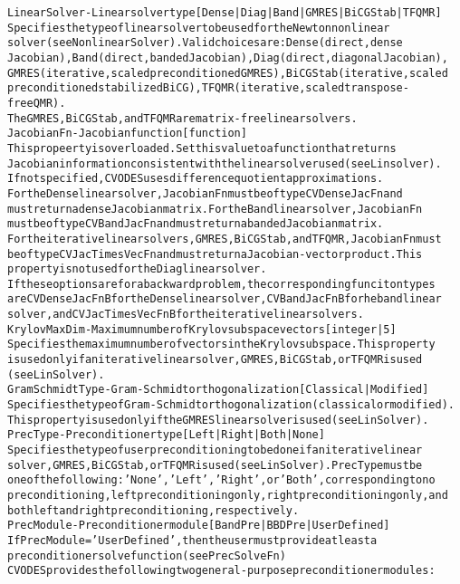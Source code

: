 \begin{alltt}
LinearSolver - Linear solver type [{Dense}|Diag|Band|GMRES|BiCGStab|TFQMR]
   Specifies the type of linear solver to be used for the Newton nonlinear
   solver (see NonlinearSolver). Valid choices are: Dense (direct, dense
   Jacobian), Band (direct, banded Jacobian), Diag (direct, diagonal Jacobian),
   GMRES (iterative, scaled preconditioned GMRES), BiCGStab (iterative, scaled
   preconditioned stabilized BiCG), TFQMR (iterative, scaled transpose-free QMR).
   The GMRES, BiCGStab, and TFQMR are matrix-free linear solvers.
JacobianFn - Jacobian function [ function ]
   This propeerty is overloaded. Set this value to a function that returns
   Jacobian information consistent with the linear solver used (see Linsolver).
   If not specified, CVODES uses difference quotient approximations.
   For the Dense linear solver, JacobianFn must be of type CVDenseJacFn and
   must return a dense Jacobian matrix. For the Band linear solver, JacobianFn
   must be of type CVBandJacFn and must return a banded Jacobian matrix.
   For the iterative linear solvers, GMRES, BiCGStab, and TFQMR, JacobianFn must
   be of type CVJacTimesVecFn and must return a Jacobian-vector product. This
   property is not used for the Diag linear solver.
   If these options are for a backward problem, the corresponding funciton types
   are CVDenseJacFnB for the Dense linear solver, CVBandJacFnB for he band linear
   solver, and CVJacTimesVecFnB for the iterative linear solvers.
KrylovMaxDim - Maximum number of Krylov subspace vectors [ integer | {5} ]
   Specifies the maximum number of vectors in the Krylov subspace. This property
   is used only if an iterative linear solver, GMRES, BiCGStab, or TFQMR is used
   (see LinSolver).
GramSchmidtType - Gram-Schmidt orthogonalization [ Classical | {Modified} ]
   Specifies the type of Gram-Schmidt orthogonalization (classical or modified).
   This property is used only if the GMRES linear solver is used (see LinSolver).
PrecType - Preconditioner type [ Left | Right | Both | {None} ]
   Specifies the type of user preconditioning to be done if an iterative linear
   solver, GMRES, BiCGStab, or TFQMR is used (see LinSolver). PrecType must be
   one of the following: 'None', 'Left', 'Right', or 'Both', corresponding to no
   preconditioning, left preconditioning only, right preconditioning only, and
   both left and right preconditioning, respectively.
PrecModule - Preconditioner module [ BandPre | BBDPre | {UserDefined} ]
   If PrecModule = 'UserDefined', then the user must provide at least a
   preconditioner solve function (see PrecSolveFn)
   CVODES provides the following two general-purpose preconditioner modules:

\end{alltt}
